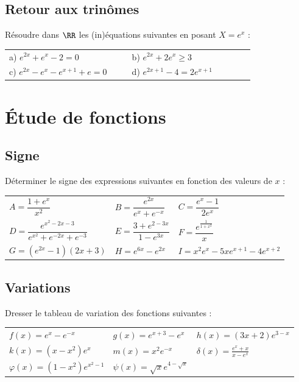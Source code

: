 \documentclass[oneside,12pt]{book}          %
\begin{document}
\subsection{Retour aux trinômes}
Résoudre dans $\RR$ les (in)équations suivantes en posant $X=e^{x}$ :

\begin{tabular}{p{0.4\linewidth}p{0.4\linewidth}}
    a) $e^{2x}+e^{x}-2 = 0$ & b) $e^{2x}+2e^{x}\ge3$ \\
    c) $e^{2x}-e^{x}-e^{x+1}+e=0$ & d) $e^{2x+1}-4=2e^{x+1}$
\end{tabular}



\section{Étude de fonctions}

\subsection{Signe}
Déterminer le signe des expressions suivantes en fonction des valeurs de $x$ :

\renewcommand{\arraystretch}{2.4}
\begin{tabular}{p{} p{} p{}}
     $A=\dfrac{1+e^{x}}{x^{2}}$ & $B=\dfrac{e^{2x}}{e^{x}+e^{-x}}$ & $C=\dfrac{e^{x}-1}{2e^{x}}$ \\
     $D=\dfrac{e^{x^{2}-2x-3}}{e^{x^{2}}+e^{-2x}+e^{-3}}$ & $E=\dfrac{3+e^{2-3x}}{1-e^{3x}}$ & $F=
     \dfrac{e^{\frac{1}{1+x^{2}}}}{x}$\\
     $G = \left(e^{2x}-1\right)(2x+3)$ & $H = e^{6x}-e^{2x}$ & $I = x^2e^x-5xe^{x+1}-4e^{x+2}$
\end{tabular}



\subsection{Variations}
Dresser le tableau de variation des fonctions suivantes :

\renewcommand{\arraystretch}{1.3}
\begin{tabular}{p{} p{} p{}}
    $f(x)=e^{x}-e^{-x}$ & $g(x)=e^{x+3}-e^{x}$ & $h(x)=(3x+2)e^{3-x}$ \\
    $k(x)=(x-x^{2})e^{x}$ & $m(x)=x^{2}e^{-x}$ & $\delta(x)=\frac{e^{x}+x}{x-e^{x}}$ \\
    $\varphi(x)=(1-x^2)e^{x^2-1}$ & $\psi(x)=\sqrt{x}e^{4-\sqrt{x}}$ \\
\end{tabular}
\end{document}
